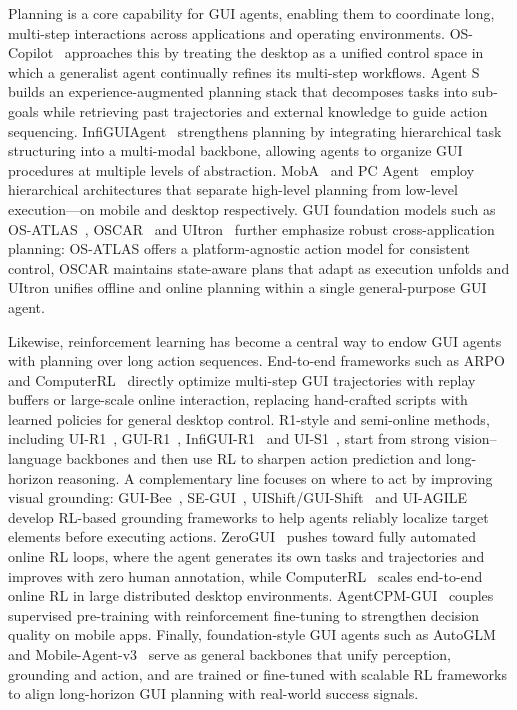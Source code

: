 


Planning is a core capability for GUI agents, enabling them to coordinate long, multi-step interactions across applications and operating environments. OS-Copilot~\cite{wu2024copilot} approaches this by treating the desktop as a unified control space in which a generalist agent continually refines its multi-step workflows. Agent S~\cite{agashe2024agent} builds an experience-augmented planning stack that decomposes tasks into sub-goals while retrieving past trajectories and external knowledge to guide action sequencing. InfiGUIAgent~\cite{liu2025infiguiagent} strengthens planning by integrating hierarchical task structuring into a multi-modal backbone, allowing agents to organize GUI procedures at multiple levels of abstraction. MobA~\cite{zhu2025moba} and PC Agent~\cite{liu2025pc} employ hierarchical architectures that separate high-level planning from low-level execution—on mobile and desktop respectively. GUI foundation models such as OS-ATLAS~\cite{wu2024atlas}, OSCAR~\cite{wang2024oscar} and UItron~\cite{zeng2025uitron} further emphasize robust cross-application planning: OS-ATLAS offers a platform-agnostic action model for consistent control, OSCAR maintains state-aware plans that adapt as execution unfolds and UItron unifies offline and online planning within a single general-purpose GUI agent. 


Likewise, reinforcement learning has become a central way to endow GUI agents with planning over long action sequences. End-to-end frameworks such as ARPO~\cite{fanbin2025arpoendtoend} and ComputerRL~\cite{hanyu2025computerrl} directly optimize multi-step GUI trajectories with replay buffers or large-scale online interaction, replacing hand-crafted scripts with learned policies for general desktop control. R1-style and semi-online methods, including UI-R1~\cite{zhengxi2025uir1}, GUI-R1~\cite{run2025guir1}, InfiGUI-R1~\cite{yuhang2025infiguir1} and UI-S1~\cite{zhengxi2025uis1}, start from strong vision–language backbones and then use RL to sharpen action prediction and long-horizon reasoning. A complementary line focuses on where to act by improving visual grounding: GUI-Bee~\cite{yue2025guibee}, SE-GUI~\cite{xinbin2025enhancing}, UIShift/GUI-Shift~\cite{gao2025guishiftenhancingvlmbasedgui} and UI-AGILE~\cite{shuquan2025uiagile} develop RL-based grounding frameworks to help agents reliably localize target elements before executing actions. ZeroGUI~\cite{chenyu2025zerogui} pushes toward fully automated online RL loops, where the agent generates its own tasks and trajectories and improves with zero human annotation, while ComputerRL~\cite{hanyu2025computerrl} scales end-to-end online RL in large distributed desktop environments. AgentCPM-GUI~\cite{zhong2025agentcpmgui} couples supervised pre-training with reinforcement fine-tuning to strengthen decision quality on mobile apps. Finally, foundation-style GUI agents such as AutoGLM~\cite{xiao2024autoglm} and Mobile-Agent-v3~\cite{jiabo2025mobileagentv3} serve as general backbones that unify perception, grounding and action, and are trained or fine-tuned with scalable RL frameworks to align long-horizon GUI planning with real-world success signals.

